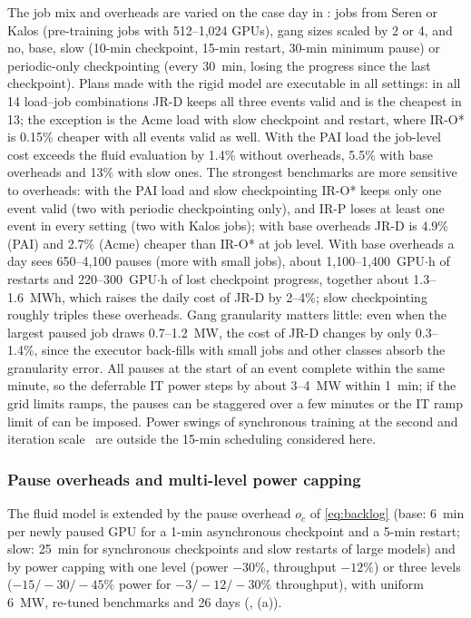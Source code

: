 The job mix and overheads are varied on the case day in : jobs from Seren or Kalos (pre-training
jobs with 512--1,024 GPUs), gang sizes scaled by 2 or 4, and no, base, slow (10-min checkpoint, 15-min restart, 30-min
minimum pause) or periodic-only checkpointing (every 30~min, losing the progress since the last checkpoint). Plans made
with the rigid model are executable in all settings: in all 14 load--job combinations JR-D keeps all three events valid
and is the cheapest in 13; the exception is the Acme load with slow checkpoint and restart, where IR-O* is 0.15\% cheaper
with all events valid as well. With the PAI load the job-level cost exceeds the fluid evaluation by 1.4\% without
overheads, 5.5\% with base overheads and 13\% with slow ones. The strongest benchmarks are more sensitive to overheads:
with the PAI load and slow checkpointing IR-O* keeps only one event valid (two with periodic checkpointing only), and IR-P
loses at least one event in every setting (two with Kalos jobs); with base overheads JR-D is 4.9\% (PAI) and 2.7\%
(Acme) cheaper than IR-O* at job level. With base overheads a day sees 650--4,100 pauses (more with small jobs), about
1,100--1,400~GPU$\cdot$h of restarts and 220--300~GPU$\cdot$h of lost checkpoint progress, together about 1.3--1.6~MWh,
which raises the daily cost of JR-D by 2--4\%; slow checkpointing roughly triples these overheads. Gang granularity
matters little: even when the largest paused job draws 0.7--1.2~MW, the cost of JR-D changes by only 0.3--1.4\%, since
the executor back-fills with small jobs and other classes absorb the granularity error. All pauses at the start of an
event complete within the same minute, so the deferrable IT power steps by about 3--4~MW within 1~min; if the grid
limits ramps, the pauses can be staggered over a few minutes or the IT ramp limit of  can be
imposed. Power swings of synchronous training at the second and iteration scale~\cite{choukse2025} are outside the 15-min
scheduling considered here.

\subsubsection{Pause overheads and multi-level power capping}
\label{sec:ext-overhead}

The fluid model is extended by the pause overhead $o_c$ of \eqref{eq:backlog} (base: 6~min per newly paused GPU for a
1-min asynchronous checkpoint and a 5-min restart; slow: 25~min for synchronous checkpoints and slow restarts of large
models) and by power capping with one level (power $-30\%$, throughput $-12\%$) or three levels ($-15/-30/-45\%$ power
for $-3/-12/-30\%$ throughput), with uniform 6~MW, re-tuned benchmarks and 26 days (,
(a)).

